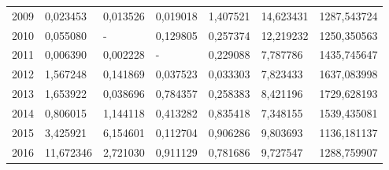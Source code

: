 \begin{table}
\begin{tabular}{p{1cm}p{2cm}p{2cm}p{2cm}p{2cm}p{2cm}p{2cm}}
 2009 &                                  0,023453 &                            0,013526 &                             0,019018 &                          1,407521 &                       14,623431 & 1287,543724 \\
 2010 &                                  0,055080 &                                   - &                             0,129805 &                          0,257374 &                       12,219232 & 1250,350563 \\
 2011 &                                  0,006390 &                            0,002228 &                                    - &                          0,229088 &                        7,787786 & 1435,745647 \\
 2012 &                                  1,567248 &                            0,141869 &                             0,037523 &                          0,033303 &                        7,823433 & 1637,083998 \\
 2013 &                                  1,653922 &                            0,038696 &                             0,784357 &                          0,258383 &                        8,421196 & 1729,628193 \\
 2014 &                                  0,806015 &                            1,144118 &                             0,413282 &                          0,835418 &                        7,348155 & 1539,435081 \\
 2015 &                                  3,425921 &                            6,154601 &                             0,112704 &                          0,906286 &                        9,803693 & 1136,181137 \\
 2016 &                                 11,672346 &                            2,721030 &                             0,911129 &                          0,781686 &                        9,727547 & 1288,759907 \\
\bottomrule
\end{tabular}
\end{table}
